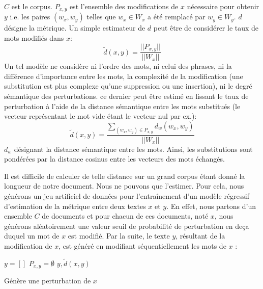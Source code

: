 $C$ est le corpus. $P_{x,y}$ est l'ensemble des modifications de $x$ nécessaire pour obtenir $y$ i.e. les paires $(w_x, w_y)$ telles que $w_x \in W_x$ a été remplacé par $w_y \in W_y$. $d$ désigne la métrique. Un simple estimateur de $d$ peut être de considérer le taux de mots modifiés dans $x$: 
\begin{equation}
\widetilde{d}(x,y) = \frac{\vert\vert P_{x,y} \vert\vert}{\vert\vert W_x \vert\vert}
\end{equation}
 Un tel modèle ne considère ni l'ordre des mots, ni celui des phrases, ni la différence d'importance entre les mots, la complexité de la modification (une substitution est plus complexe qu'une suppression ou une insertion), ni le degré sémantique des perturbations. ce dernier peut être estimé en lissant le taux de perturbation à l'aide de la distance sémantique entre les mots substitués (le vecteur représentant le mot vide étant le vecteur nul par ex.):
\begin{equation}
\widetilde{d}(x,y) = \frac{\sum\limits_{(w_x, w_y) \in P_{x,y}} d_w(w_x,w_y)}{\vert\vert W_x \vert\vert} \label{equation:similarite:somme-dist-mots}
\end{equation}
$d_w$ désignant la distance sémantique entre les mots. Ainsi, les substitutions sont pondérées par la distance cosinus entre les vecteurs des mots échangés.

Il est difficile de calculer de telle distance sur un grand corpus étant donné la longueur de notre document. 
Nous ne pouvons que l'estimer. Pour cela, nous générons un jeu artificiel de données pour l'entraînement d'un modèle régressif d'estimation de la métrique entre deux textes $x$ et $y$. En effet, nous partons d'un ensemble $C$ de documents et pour chacun de ces documents, noté $x$, nous générons aléatoirement une valeur seuil de probabilité de perturbation en deça duquel un mot de $x$ est modifié. Par la suite, le texte  $y$, résultant de la modification de $x$, est généré en modifiant séquentiellement les mots de $x$ :

\begin{algorithm}[!htb] %
 $y = [] $\; 
 $P_{x,y} = \emptyset$\;
 \Return $y, \widetilde{d}(x,y)$\;
 \caption{Génère une perturbation de $x$} \label{algo:similarite:perturbation}
\end{algorithm}


